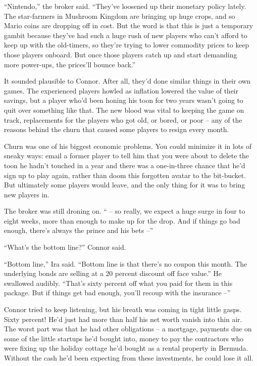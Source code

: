 ``Nintendo,'' the broker said. ``They've loosened up their monetary
policy lately. The star-farmers in Mushroom Kingdom are bringing up
huge crops, and so Mario coins are dropping off in cost. But the
word is that this is just a temporary gambit because they've had
such a huge rush of new players who can't afford to keep up with
the old-timers, so they're trying to lower commodity prices to keep
those players onboard. But once those players catch up and start
demanding more power-ups, the prices'll bounce back.''

It sounded plausible to Connor. After all, they'd done similar
things in their own games. The experienced players howled as
inflation lowered the value of their savings, but a player who'd
been honing his toon for two years wasn't going to quit over
something like that. The new blood was vital to keeping the game on
track, replacements for the players who got old, or bored, or poor
-- any of the reasons behind the churn that caused some players to
resign every month.

Churn was one of his biggest economic problems. You could minimize
it in lots of sneaky ways: email a former player to tell him that
you were about to delete the toon he hadn't touched in a year and
there was a one-in-three chance that he'd sign up to play again,
rather than doom this forgotten avatar to the bit-bucket. But
ultimately some players would leave, and the only thing for it was
to bring new players in.

The broker was still droning on. `` -- so really, we expect a huge
surge in four to eight weeks, more than enough to make up for the
drop. And if things go bad enough, there's always the prince and
his bets --''

``What's the bottom line?'' Connor said.

``Bottom line,'' Ira said. ``Bottom line is that there's no coupon
this month. The underlying bonds are selling at a 20 percent
discount off face value.'' He swallowed audibly. ``That's sixty
percent off what you paid for them in this package. But if things
get bad enough, you'll recoup with the insurance --''

Connor tried to keep listening, but his breath was coming in tight
little gasps. Sixty percent! He'd just had more than half his net
worth vanish into thin air. The worst part was that he had other
obligations -- a mortgage, payments due on some of the little
startups he'd bought into, money to pay the contractors who were
fixing up the holiday cottage he'd bought as a rental property in
Bermuda. Without the cash he'd been expecting from these
investments, he could lose it all.

